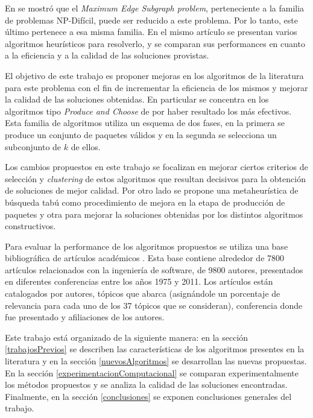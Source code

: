 En \cite{compositeRetrival} se mostr\'o que el {\em Maximum Edge Subgraph problem}, perteneciente a la familia de problemas NP-Dif\'icil, puede ser reducido a este problema. Por lo tanto, este \'ultimo pertenece a esa misma familia. En el mismo art\'iculo se presentan varios algoritmos heur\'isticos para resolverlo, y se comparan sus performances en cuanto a la eficiencia y a la calidad de las soluciones provistas.   

El objetivo de este trabajo es proponer mejoras en los algoritmos de la literatura para este problema con el fin de incrementar la eficiencia de los mismos y mejorar la calidad de las soluciones obtenidas. En particular se concentra en los algoritmos tipo {\em Produce and Choose} de \cite{compositeRetrival} por haber resultado los m\'as efectivos. Esta familia de algoritmos utiliza un esquema de dos fases, en la primera se produce un conjunto de paquetes v\'alidos y en la segunda se selecciona un subconjunto de $k$ de ellos.

Los cambios propuestos en este trabajo se focalizan en mejorar ciertos criterios de selecci\'on y {\em clustering} de estos algoritmos que resultan decisivos para la obtenci\'on de soluciones de mejor calidad. Por otro lado se propone una metaheur\'istica de b\'usqueda tab\'u como procedimiento de mejora en la etapa de producci\'on de paquetes y otra para mejorar la soluciones obtenidas por los distintos algoritmos constructivos.
 
Para evaluar la performance de los algoritmos propuestos se utiliza una base bibliogr\'afica de art\'iculos acad\'emicos \cite{dataDrive}. Esta base contiene alrededor de 7800 art\'iculos relacionados con la ingenier\'ia de software, de 9800 autores, presentados en diferentes conferencias entre los a\~nos 1975 y 2011. Los art\'iculos est\'an catalogados por autores, t\'opicos que abarca (asign\'andole un porcentaje de relevancia para cada uno de los 37 t\'opicos que se consideran), conferencia donde fue presentado y afiliaciones de los autores. 

Este trabajo est\'a organizado de la siguiente manera: en la secci\'on \ref{trabajosPrevios} se describen las caracter\'isticas de los algoritmos presentes en la literatura y en la secci\'on \ref{nuevosAlgoritmos} se desarrollan las nuevas propuestas. En la secci\'on \ref{experimentacionComputacional} se comparan experimentalmente los m\'etodos propuestos y se analiza la calidad de las soluciones encontradas. Finalmente, en la secci\'on \ref{conclusiones} se exponen conclusiones generales del trabajo.
